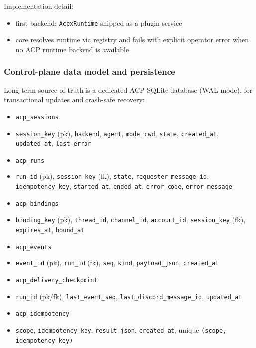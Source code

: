 Implementation detail:

\begin{itemize}
  \item first backend: \texttt{AcpxRuntime} shipped as a plugin service
  \item core resolves runtime via registry and fails with explicit operator error when no ACP runtime backend is available
\end{itemize}


\subsubsection{Control-plane data model and persistence}


Long-term source-of-truth is a dedicated ACP SQLite database (WAL mode), for transactional updates and crash-safe recovery:

\begin{itemize}
  \item \texttt{acp\_sessions}
  \item \texttt{session\_key} (pk), \texttt{backend}, \texttt{agent}, \texttt{mode}, \texttt{cwd}, \texttt{state}, \texttt{created\_at}, \texttt{updated\_at}, \texttt{last\_error}
  \item \texttt{acp\_runs}
  \item \texttt{run\_id} (pk), \texttt{session\_key} (fk), \texttt{state}, \texttt{requester\_message\_id}, \texttt{idempotency\_key}, \texttt{started\_at}, \texttt{ended\_at}, \texttt{error\_code}, \texttt{error\_message}
  \item \texttt{acp\_bindings}
  \item \texttt{binding\_key} (pk), \texttt{thread\_id}, \texttt{channel\_id}, \texttt{account\_id}, \texttt{session\_key} (fk), \texttt{expires\_at}, \texttt{bound\_at}
  \item \texttt{acp\_events}
  \item \texttt{event\_id} (pk), \texttt{run\_id} (fk), \texttt{seq}, \texttt{kind}, \texttt{payload\_json}, \texttt{created\_at}
  \item \texttt{acp\_delivery\_checkpoint}
  \item \texttt{run\_id} (pk/fk), \texttt{last\_event\_seq}, \texttt{last\_discord\_message\_id}, \texttt{updated\_at}
  \item \texttt{acp\_idempotency}
  \item \texttt{scope}, \texttt{idempotency\_key}, \texttt{result\_json}, \texttt{created\_at}, unique \texttt{(scope, idempotency\_key)}
\end{itemize}


